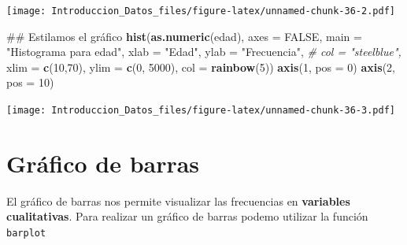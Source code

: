 \documentclass[spanish,]{book}
\newenvironment{Shaded}{\begin{snugshade}}{\end{snugshade}}
\newcommand{\KeywordTok}[1]{\textcolor[rgb]{0.13,0.29,0.53}{\textbf{#1}}}
\newcommand{\DataTypeTok}[1]{\textcolor[rgb]{0.13,0.29,0.53}{#1}}
\newcommand{\DecValTok}[1]{\textcolor[rgb]{0.00,0.00,0.81}{#1}}
\newcommand{\StringTok}[1]{\textcolor[rgb]{0.31,0.60,0.02}{#1}}
\newcommand{\CommentTok}[1]{\textcolor[rgb]{0.56,0.35,0.01}{\textit{#1}}}
\newcommand{\OtherTok}[1]{\textcolor[rgb]{0.56,0.35,0.01}{#1}}
\newcommand{\OperatorTok}[1]{\textcolor[rgb]{0.81,0.36,0.00}{\textbf{#1}}}
\newcommand{\NormalTok}[1]{#1}
\begin{document}
\texttt{[image: Introduccion\_Datos\_files/figure-latex/unnamed-chunk-36-2.pdf]}

\begin{Shaded}
\begin{Highlighting}[]
\NormalTok{## Estilamos el gráfico}
\KeywordTok{hist}\NormalTok{(}\KeywordTok{as.numeric}\NormalTok{(edad),}
     \DataTypeTok{axes =} \OtherTok{FALSE}\NormalTok{,}
     \DataTypeTok{main =} \StringTok{"Histograma para edad"}\NormalTok{,}
     \DataTypeTok{xlab =} \StringTok{"Edad"}\NormalTok{,}
     \DataTypeTok{ylab =} \StringTok{"Frecuencia"}\NormalTok{,}
     \CommentTok{# col = "steelblue",}
     \DataTypeTok{xlim =} \KeywordTok{c}\NormalTok{(}\DecValTok{10}\NormalTok{,}\DecValTok{70}\NormalTok{),}
     \DataTypeTok{ylim =} \KeywordTok{c}\NormalTok{(}\DecValTok{0}\NormalTok{, }\DecValTok{5000}\NormalTok{),}
     \DataTypeTok{col =} \KeywordTok{rainbow}\NormalTok{(}\DecValTok{5}\NormalTok{))}
\KeywordTok{axis}\NormalTok{(}\DecValTok{1}\NormalTok{, }\DataTypeTok{pos =} \DecValTok{0}\NormalTok{)}
\KeywordTok{axis}\NormalTok{(}\DecValTok{2}\NormalTok{, }\DataTypeTok{pos =} \DecValTok{10}\NormalTok{)}
\end{Highlighting}
\end{Shaded}

\texttt{[image: Introduccion\_Datos\_files/figure-latex/unnamed-chunk-36-3.pdf]}

\section{Gráfico de barras}\label{grafico-de-barras}

El gráfico de barras nos permite visualizar las frecuencias en
\textbf{variables cualitativas}. Para realizar un gráfico de barras
podemo utilizar la función \texttt{barplot}

\begin{Shaded}
\end{Shaded}
\end{document}
